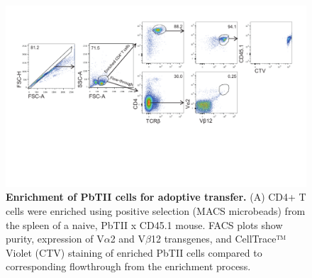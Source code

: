 \begin{figure}
    \centering
    \includegraphics[width=\textwidth]{"Fig S1 rev3"}
    \caption[Enrichment of PbTII cells for adoptive transfer]{\textbf{Enrichment of PbTII cells for adoptive transfer.} (A) CD4+ T cells were enriched using positive selection (MACS microbeads) from the spleen of a naive, PbTII x CD45.1 mouse. FACS plots show purity, expression of V\( \alpha \)2 and V\( \beta \)12 transgenes, and CellTrace™ Violet (CTV) staining of enriched PbTII cells compared to corresponding flowthrough from the enrichment process.}
    \label{fig:ms1}
\end{figure}

